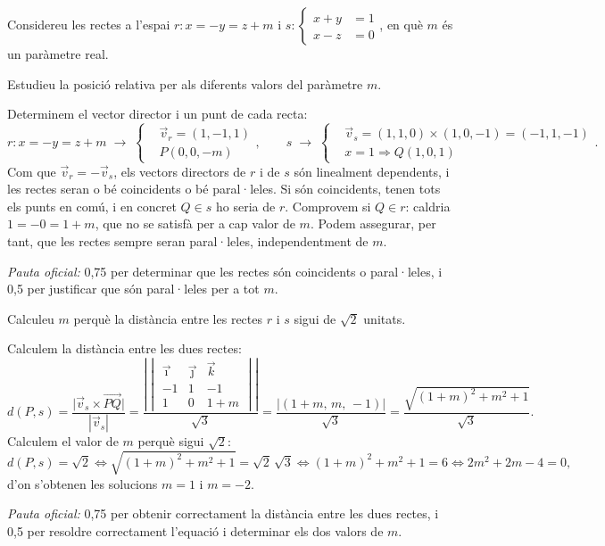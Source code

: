 Considereu les rectes a l'espai $r\colon x=-y=z+m$ i
$s\colon\left\{\begin{aligned}x+y&=1\\x-z&=0\end{aligned}\right.$, en què $m$ és un paràmetre real.

\begin{apartats}

Estudieu la posició relativa per als diferents valors del paràmetre $m$.

\begin{solucio}
Determinem el vector director i un punt de cada recta:
\[
r\colon x=-y=z+m\;\rightarrow\;\left\{\begin{aligned}&\vec v_r=(1,-1,1)\\&P(0,0,-m)\end{aligned}\right.,\qquad
s\;\rightarrow\;\left\{\begin{aligned}&\vec v_s=(1,1,0)\times(1,0,-1)=(-1,1,-1)\\&x=1\Rightarrow Q(1,0,1)\end{aligned}\right..
\]
Com que $\vec v_r=-\vec v_s$, els vectors directors de $r$ i de $s$ són linealment dependents, i les rectes seran o
bé coincidents o bé paral·leles. Si són coincidents, tenen tots els punts en comú, i en concret $Q\in s$ ho seria
de $r$. Comprovem si $Q\in r$: caldria $1=-0=1+m$, que no se satisfà per a cap valor de $m$. Podem assegurar, per
tant, que les rectes sempre seran paral·leles, independentment de $m$.

\textit{Pauta oficial:} 0,75 per determinar que les rectes són coincidents o paral·leles, i 0,5 per justificar que
són paral·leles per a tot $m$.
\end{solucio}

Calculeu $m$ perquè la distància entre les rectes $r$ i $s$ sigui de $\sqrt2$ unitats.

\begin{solucio}
Calculem la distància entre les dues rectes:
\[
d(P,s)=\frac{\bigl|\vec v_s\times\overrightarrow{PQ}\bigr|}{\left|\vec v_s\right|}
=\frac{\left|\begin{vmatrix}\vec\imath&\vec\jmath&\vec k\\-1&1&-1\\1&0&1+m\end{vmatrix}\right|}{\sqrt3}
=\frac{\bigl|(1+m,\,m,\,-1)\bigr|}{\sqrt3}=\frac{\sqrt{(1+m)^2+m^2+1}}{\sqrt3}.
\]
Calculem el valor de $m$ perquè sigui $\sqrt2$:
\[
d(P,s)=\sqrt2\iff\sqrt{(1+m)^2+m^2+1}=\sqrt2\,\sqrt3\iff(1+m)^2+m^2+1=6\iff2m^2+2m-4=0,
\]
d'on s'obtenen les solucions $m=1$ i $m=-2$.

\textit{Pauta oficial:} 0,75 per obtenir correctament la distància entre les dues rectes, i 0,5 per resoldre
correctament l'equació i determinar els dos valors de $m$.
\end{solucio}

\end{apartats}
